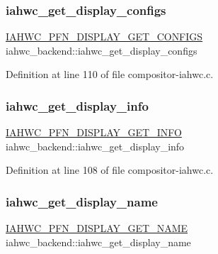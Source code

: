 \subsubsection{\texorpdfstring{iahwc\+\_\+get\+\_\+display\+\_\+configs}{iahwc\_get\_display\_configs}}
{\footnotesize\ttfamily \mbox{\hyperlink{iahwc_8h_a2dfc704af6f663d2fdec94baa5192687}{I\+A\+H\+W\+C\+\_\+\+P\+F\+N\+\_\+\+D\+I\+S\+P\+L\+A\+Y\+\_\+\+G\+E\+T\+\_\+\+C\+O\+N\+F\+I\+GS}} iahwc\+\_\+backend\+::iahwc\+\_\+get\+\_\+display\+\_\+configs}



Definition at line 110 of file compositor-\/iahwc.\+c.

\mbox{\label{structiahwc__backend_a85bf879c1fbd6ad3c4b60093fd81fd8f}} 
\subsubsection{\texorpdfstring{iahwc\+\_\+get\+\_\+display\+\_\+info}{iahwc\_get\_display\_info}}
{\footnotesize\ttfamily \mbox{\hyperlink{iahwc_8h_a79bdf92b174300d2af098db065a6f0fd}{I\+A\+H\+W\+C\+\_\+\+P\+F\+N\+\_\+\+D\+I\+S\+P\+L\+A\+Y\+\_\+\+G\+E\+T\+\_\+\+I\+N\+FO}} iahwc\+\_\+backend\+::iahwc\+\_\+get\+\_\+display\+\_\+info}



Definition at line 108 of file compositor-\/iahwc.\+c.

\mbox{\label{structiahwc__backend_acd2af93ffe7dd200b432b95e9f74552e}} 
\subsubsection{\texorpdfstring{iahwc\+\_\+get\+\_\+display\+\_\+name}{iahwc\_get\_display\_name}}
{\footnotesize\ttfamily \mbox{\hyperlink{iahwc_8h_ad2adbed7924879769d74abf89313f6d6}{I\+A\+H\+W\+C\+\_\+\+P\+F\+N\+\_\+\+D\+I\+S\+P\+L\+A\+Y\+\_\+\+G\+E\+T\+\_\+\+N\+A\+ME}} iahwc\+\_\+backend\+::iahwc\+\_\+get\+\_\+display\+\_\+name}



